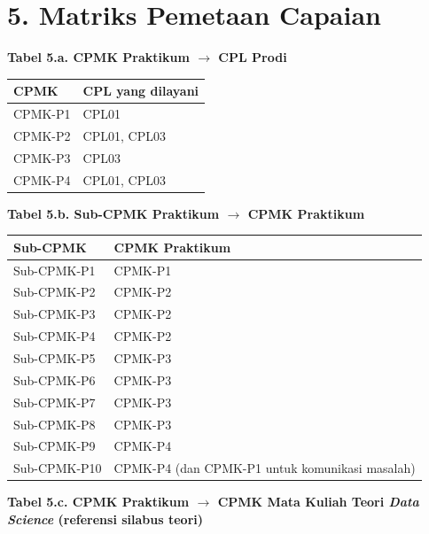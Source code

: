 \documentclass[12pt,a4paper]{article}
\begin{document}
\vspace{0.5cm}

\section*{5. Matriks Pemetaan Capaian}

\textbf{Tabel 5.a. CPMK Praktikum $\rightarrow$ CPL Prodi}

\vspace{0.25cm}
{\small
\begin{tabular}{|l|p{9.5cm}|}
\hline
\textbf{CPMK} & \textbf{CPL yang dilayani} \\
\hline
CPMK-P1 & CPL01 \\
\hline
CPMK-P2 & CPL01, CPL03 \\
\hline
CPMK-P3 & CPL03 \\
\hline
CPMK-P4 & CPL01, CPL03 \\
\hline
\end{tabular}
}

\vspace{0.45cm}

\textbf{Tabel 5.b. Sub-CPMK Praktikum $\rightarrow$ CPMK Praktikum}

\vspace{0.25cm}
{\small
\begin{tabular}{|l|l|}
\hline
\textbf{Sub-CPMK} & \textbf{CPMK Praktikum} \\
\hline
Sub-CPMK-P1 & CPMK-P1 \\
\hline
Sub-CPMK-P2 & CPMK-P2 \\
\hline
Sub-CPMK-P3 & CPMK-P2 \\
\hline
Sub-CPMK-P4 & CPMK-P2 \\
\hline
Sub-CPMK-P5 & CPMK-P3 \\
\hline
Sub-CPMK-P6 & CPMK-P3 \\
\hline
Sub-CPMK-P7 & CPMK-P3 \\
\hline
Sub-CPMK-P8 & CPMK-P3 \\
\hline
Sub-CPMK-P9 & CPMK-P4 \\
\hline
Sub-CPMK-P10 & CPMK-P4 (dan CPMK-P1 untuk komunikasi masalah) \\
\hline
\end{tabular}
}

\vspace{0.45cm}

\textbf{Tabel 5.c. CPMK Praktikum $\rightarrow$ CPMK Mata Kuliah Teori \textit{Data Science} (referensi silabus teori)}
\end{document}
